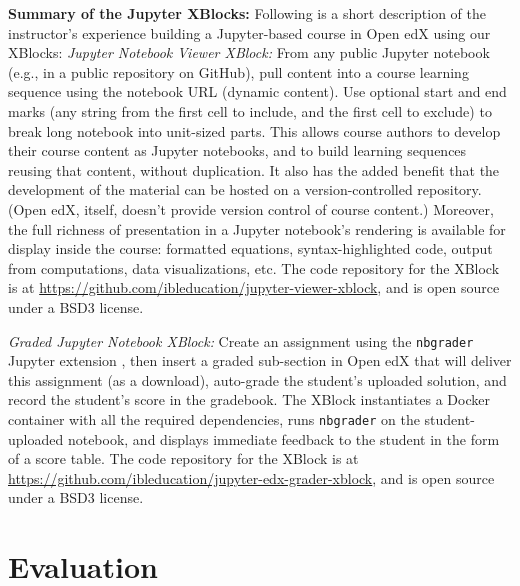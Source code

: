 \documentclass[10pt,journal,compsoc]{IEEEtran}
\begin{document}
\noindent \textbf{Summary of the Jupyter XBlocks:}
Following is a short description of the instructor's experience building a Jupyter-based course in Open edX using our XBlocks:
\emph{Jupyter Notebook Viewer XBlock:} From any public Jupyter notebook (e.g., in a public repository on GitHub), pull content into a course learning sequence using the notebook URL (dynamic content). 
Use optional start and end marks (any string from the first cell to include, and the first cell to exclude) to break long notebook into unit-sized parts. 
This allows course authors to develop their course content as Jupyter notebooks, and to build learning sequences reusing that content, without duplication. 
It also has the added benefit that the development of the material can be hosted on a version-controlled repository. (Open edX, itself, doesn't provide version control of course content.)
Moreover, the full richness of presentation in a Jupyter notebook's rendering is available for display inside the course: formatted equations, syntax-highlighted code, output from computations, data visualizations, etc.
The code repository for the XBlock is at \url{https://github.com/ibleducation/jupyter-viewer-xblock}, and is open source under a BSD3 license.

\emph{Graded Jupyter Notebook XBlock:} Create an assignment using the \texttt{nbgrader} Jupyter extension \cite{hamrick2016,blank2019}, then insert a graded sub-section in Open edX that will deliver this assignment (as a download), auto-grade the student's uploaded solution, and record the student's score in the gradebook. 
The XBlock instantiates a Docker container with all the required dependencies, runs \texttt{nbgrader} on the student-uploaded notebook, and displays immediate feedback to the student in the form of a score table. 
The code repository for the XBlock is at \url{https://github.com/ibleducation/jupyter-edx-grader-xblock}, and is open source under a BSD3 license.

\section{Evaluation}
\end{document}
